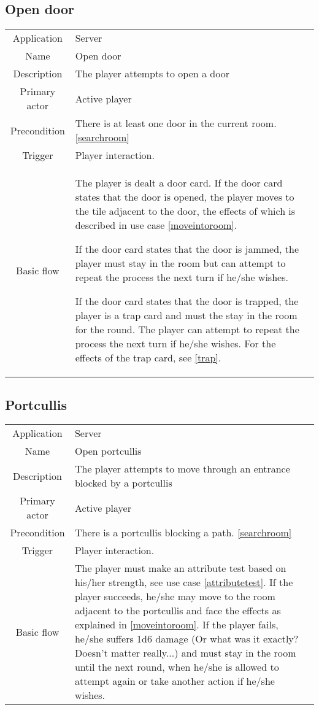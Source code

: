 \subsection{Open door}
\label{opendoor}
\begin{tabular}{|c| p{9cm}|c}
\hline
Application & Server \\
Name & Open door \\
Description & The player attempts to open a door \\
Primary actor & Active player \\
Precondition & There is at least one door in the current room. \ref{searchroom} \\
Trigger & Player interaction.  \\ \hline
Basic flow & The player is dealt a door card. If the door card states that the door is opened, the player moves to the tile adjacent to the door, the effects of which is described in use case \ref{moveintoroom}.

If the door card states that the door is jammed, the player must stay in the room but can attempt to repeat the process the next turn if he/she wishes.

If the door card states that the door is trapped, the player is a trap card and must the stay in the room for the round. The player can attempt to repeat the process the next turn if he/she wishes. For the effects of the trap card, see \ref{trap}. \\ \hline
\end{tabular}

\subsection{Portcullis}
\label{portcullis}
\begin{tabular}{|c| p{9cm}|c}
\hline
Application & Server \\
Name & Open portcullis \\
Description & The player attempts to move through an entrance blocked by a portcullis \\
Primary actor & Active player \\
Precondition & There is a portcullis blocking a path. \ref{searchroom} \\
Trigger & Player interaction. \\ \hline
Basic flow & The player must make an attribute test based on his/her strength, see use case \ref{attributetest}. If the player succeeds, he/she may move to the room adjacent to the portcullis and face the effects as explained in \ref{moveintoroom}. If the player fails, he/she suffers 1d6 damage (Or what was it exactly? Doesn't matter really...) and must stay in the room until the next round, when he/she is allowed to attempt again or take another action if he/she wishes. \\ \hline
\end{tabular}



